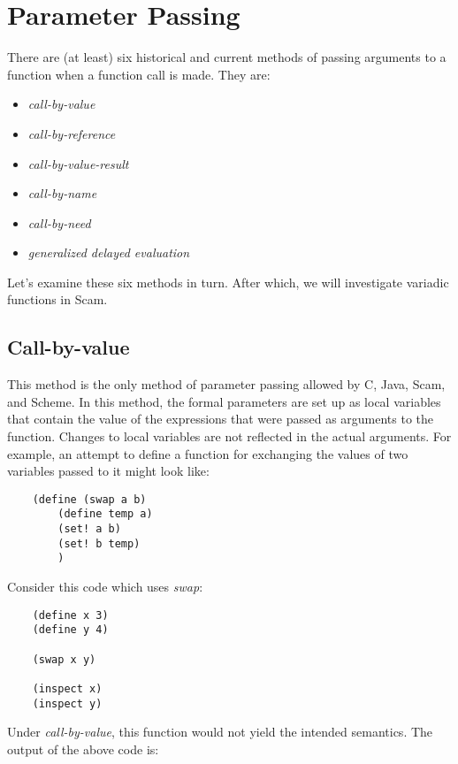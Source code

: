 \chapter{Parameter Passing}
\label{ParameterPassing}

There are (at least) six historical and current
methods of passing arguments to a function when a function call
is made. They are:

\begin{itemize}
\item
    {\it call-by-value}
\item
    {\it call-by-reference}
\item
    {\it call-by-value-result}
\item
    {\it call-by-name}
\item
    {\it call-by-need}
\item
    {\it generalized delayed evaluation}
\end{itemize}

Let's examine these six methods in turn. After which, we will
investigate variadic functions in Scam.

\section*{Call-by-value}

This method is the only method of parameter passing allowed by C, Java,
Scam, and Scheme. In this method, the formal parameters are set up as local
variables that contain the value of the expressions that were passed as
arguments to the function. Changes to local variables are not reflected
in the actual arguments. For example, an attempt to define a function
for exchanging the values
of two variables passed to it might look like:

\begin{verbatim}
    (define (swap a b)
        (define temp a)
        (set! a b)
        (set! b temp)
        )
\end{verbatim}

Consider this code which uses {\it swap}:

\begin{verbatim}
    (define x 3)
    (define y 4)

    (swap x y)

    (inspect x)
    (inspect y)
\end{verbatim}

Under {\it call-by-value},
this function would not yield the intended semantics.
The output of the above code is:

